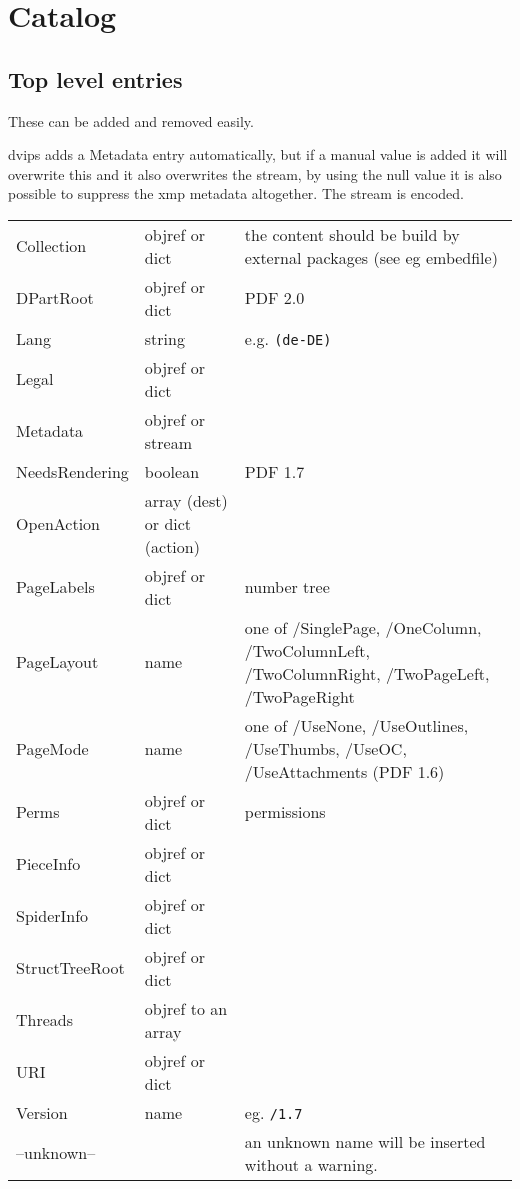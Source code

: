 \documentclass{article}
\begin{document}
\section{Catalog}
\subsection{Top level entries}
These can be added and removed easily. 

dvips adds a Metadata entry automatically, but
if a manual value is added it will overwrite this and it also
overwrites the stream, by using the null value it is also possible to
suppress the xmp metadata altogether. The stream is encoded.  
\begin{tabular}{lll}
    Collection              &  objref or dict     & the content should be
     build by external packages (see eg embedfile)                   \\
    DPartRoot               &  objref or dict     & PDF 2.0           \\
    Lang                    &  string             & e.g. \texttt{(de-DE)} \\
    Legal                   &  objref or dict                             \\
    Metadata                &  objref or stream                       \\
    NeedsRendering          &  boolean            & PDF 1.7\\
    OpenAction              &  array (dest) or dict (action) \\
    PageLabels              &  objref or dict     &  number tree \\
    PageLayout              &  name               & one of /SinglePage, /OneColumn,
                                        /TwoColumnLeft, /TwoColumnRight,
                                        /TwoPageLeft,
                                        /TwoPageRight \\
    PageMode                &  name               & one of /UseNone, /UseOutlines, /UseThumbs,
                                    /UseOC, /UseAttachments (PDF 1.6)\\
    Perms                   &  objref or dict     & permissions\\
    PieceInfo               &  objref or dict \\
    SpiderInfo              &  objref or dict \\
    StructTreeRoot          &  objref or dict \\
    Threads                 &  objref to an array\\
    URI                     &  objref or dict \\
    Version                 &  name           & eg. \texttt{/1.7} \\
    --unknown--          &                 & an unknown name will be
                                                inserted without a warning.\\
\end{tabular}                                                
\end{document}
